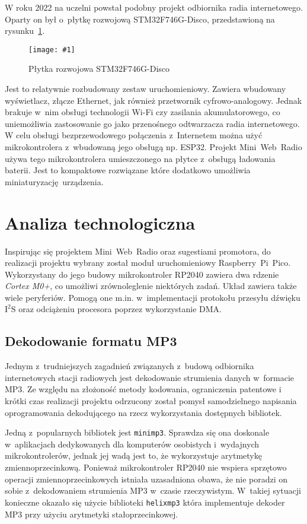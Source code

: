 \documentclass[polish]{aghengthesis}
\newcommand{\imgint}[4]{
	\begin{figure}[{#4}]
		\centering
		\texttt{[image: \#1]}
		\caption{#2}
		\label{#1}
	\end{figure}
}
\newcommand{\imgh}[3]{\imgint{#1}{#2}{#3}{H}}
\newcommand{\isqs}{$\text{I}^{2}\text{S}$}
\begin{document}
		W roku 2022 na uczelni powstał podobny projekt odbiornika radia internetowego\textsuperscript{\cite{apd_radio2}}. Oparty on był o~płytkę rozwojową STM32F746G-Disco, przedstawioną na rysunku~\ref{1/botland_stm}. 
		\imgh{1/botland_stm}{Płytka rozwojowa STM32F746G-Disco\textsuperscript{\cite{botland_stm}}}{0.6}
		Jest to relatywnie rozbudowany zestaw uruchomieniowy. Zawiera wbudowany wyświetlacz, złącze Ethernet, jak również przetwornik cyfrowo-analogowy. Jednak brakuje w~nim obsługi technologii Wi-Fi czy zasilania akumulatorowego, co uniemożliwia zastosowanie go jako przenośnego odtwarzacza radia internetowego.
		$ $\\
		
		W celu obsługi bezprzewodowego połączenia z~Internetem można użyć mikrokontrolera z~wbudowaną jego obsługą np. ESP32. Projekt Mini~Web~Radio\textsuperscript{\cite{esp32_radio}} używa tego mikrokontrolera umieszczonego na płytce z~obsługą ładowania baterii. Jest to kompaktowe rozwiązane które dodatkowo umożliwia miniaturyzację urządzenia.
	
	\section{Analiza technologiczna}
		Inspirując się projektem Mini~Web~Radio oraz sugestiami promotora, do realizacji projektu wybrany został moduł uruchomieniowy Raspberry~Pi~Pico.
		Wykorzystany do jego budowy mikrokontroler RP2040\textsuperscript{\cite{rp2040}} zawiera dwa rdzenie \textit{Cortex M0+}, co umożliwi zrównoleglenie niektórych zadań.
		Układ zawiera także wiele peryferiów. Pomogą one m.in. w~implementacji protokołu przesyłu dźwięku \isqs{} oraz odciążeniu procesora poprzez wykorzystanie DMA.
		
		\subsection{Dekodowanie formatu MP3}
			Jednym z~trudniejszych zagadnień związanych z~budową odbiornika internetowych stacji radiowych jest dekodowanie strumienia danych w~formacie MP3. Ze względu na złożoność metody kodowania, ograniczenia patentowe i~ krótki czas realizacji projektu odrzucony został pomysł samodzielnego napisania oprogramowania dekodującego na rzecz wykorzystania dostępnych bibliotek.
			
			Jedną z~popularnych bibliotek jest \lstinline|minimp3|\textsuperscript{\cite{minimp3}}. Sprawdza się ona doskonale w~aplikacjach dedykowanych dla komputerów osobistych i~wydajnych mikrokontrolerów, jednak jej wadą jest to, że wykorzystuje arytmetykę zmiennoprzecinkową. Ponieważ mikrokontroler RP2040 nie wspiera sprzętowo operacji zmiennoprzecinkowych istniała uzasadniona obawa, że nie poradzi on sobie z~dekodowaniem strumienia MP3 w~czasie rzeczywistym. W~takiej sytuacji konieczne okazało się użycie  biblioteki \lstinline|helixmp3|\textsuperscript{\cite{helixmp3_repo}} która implementuje dekoder MP3 przy użyciu arytmetyki stałoprzecinkowej.
			$ $\\
			
\end{document}

